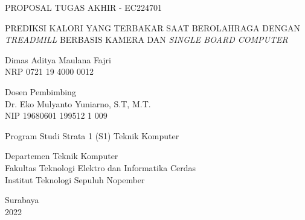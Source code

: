 \begin{large}
  PROPOSAL TUGAS AKHIR - EC224701
\end{large}

\vspace{\fill}

\begin{spacing}{1.5}
  \begin{Large}
    PREDIKSI KALORI YANG TERBAKAR SAAT BEROLAHRAGA DENGAN \emph{TREADMILL} BERBASIS KAMERA DAN \emph{SINGLE BOARD COMPUTER}
  \end{Large}
\end{spacing}

\vspace{\fill}

\begin{large}
  Dimas Aditya Maulana Fajri \\
  \textnormal{NRP 0721 19 4000 0012}
\end{large}

\vspace{\fill}

\begin{large}
  \textnormal{Dosen Pembimbing} \\
  Dr. Eko Mulyanto Yuniarno, S.T, M.T. \\
  \textnormal{NIP 19680601 199512 1 009} \\
\end{large}

\vspace{\fill}

Program Studi Strata 1 (S1) Teknik Komputer \\

\normalfont

Departemen Teknik Komputer \\
Fakultas Teknologi Elektro dan Informatika Cerdas \\
Institut Teknologi Sepuluh Nopember

Surabaya \\
2022
